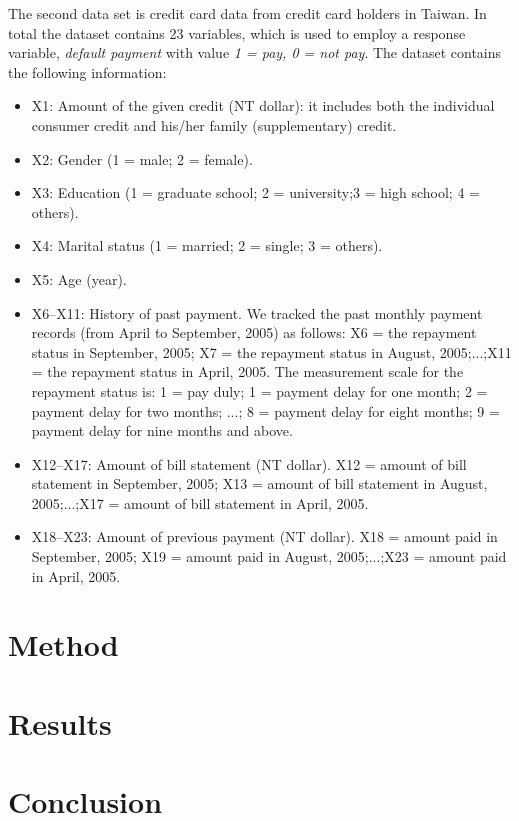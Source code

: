 \documentclass[a4paper,11pt,twocolumn]{article}
\begin{document}
The second data set is credit card data from credit card holders in Taiwan. In total the dataset contains 23 variables, which is used to employ a response variable, \textit{default payment} with value \textit{1 = pay, 0 = not pay}. The dataset contains the following information:
   
\begin{itemize}
\item X1: Amount of the given credit (NT dollar): it includes both the individual consumer credit and his/her family (supplementary) credit.
\item X2: Gender (1 = male; 2 = female).
\item X3: Education (1 = graduate school; 2 = university;3 = high school; 4 = others).
\item X4: Marital status (1 = married; 2 = single; 3 = others).
\item X5: Age (year).
\item X6–X11: History of past payment. We tracked the past monthly payment records (from April to September,
2005) as follows: X6 = the repayment status in September, 2005; X7 = the repayment status in August,
2005;...;X11 = the repayment status in April, 2005.
The measurement scale for the repayment status is:
1 = pay duly; 1 = payment delay for one month;
2 = payment delay for two months; ...; 8 = payment
delay for eight months; 9 = payment delay for nine
months and above.
\item X12–X17: Amount of bill statement (NT dollar).
X12 = amount of bill statement in September, 2005;
X13 = amount of bill statement in August,
2005;...;X17 = amount of bill statement in April, 2005. 
\item X18–X23: Amount of previous payment (NT dollar).
X18 = amount paid in September, 2005; X19 = amount
paid in August, 2005;...;X23 = amount paid in April,
2005.\cite{data}
\end{itemize}

\section{Method}

\section{Results}

\section{Conclusion}
\end{document}

